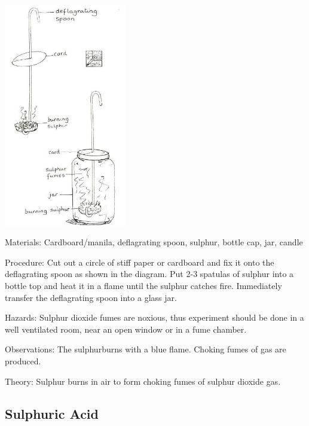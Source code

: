 \begin{multicols}{2}
\begin{center}
\includegraphics[width=0.4\textwidth]{./img/source/sulphur-dioxide.jpg}
\end{center}

\begin{description*}
\item[Materials:]{Cardboard/manila, deflagrating spoon, sulphur, bottle cap, jar, candle}
\item[Procedure:]{Cut out a circle of stiff paper or cardboard and
fix it onto the deflagrating spoon as shown in the
diagram. Put 2-3 spatulas of sulphur into a bottle
top and heat it in a flame until the sulphur
catches fire. Immediately transfer the
deflagrating spoon into a glass jar.}
\item[Hazards:]{Sulphur dioxide fumes are noxious, thus
experiment should be done in a well ventilated
room, near an open window or in a fume
chamber.}
\item[Observations:]{The sulphurburns with a blue flame. Choking
fumes of gas are produced.}
\item[Theory:]{Sulphur burns in air to form choking fumes
of sulphur dioxide gas.}
\end{description*}

\subsection{Sulphuric Acid}


\end{multicols}
